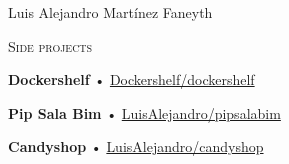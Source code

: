 \documentclass[12pt]{article}
\begin{document}
\begin{cv}{Luis Alejandro Mart\'inez Faneyth}
\begin{minipage}[t]{0.35\textwidth}
    \vspace{0.25em}
    \begin{minipage}{\linewidth}
      \textrm{\textsc{\Large{Side projects}}}
      \newline
      \parbox[t]{\linewidth}{
        \textbf{Dockershelf} • \href{https://github.com/Dockershelf/dockershelf}{Dockershelf/dockershelf}\\
      }
      \parbox[t]{\linewidth}{
        \textbf{Pip Sala Bim} • \href{https://github.com/LuisAlejandro/pipsalabim}{LuisAlejandro/pipsalabim}\\
      }
      \parbox[t]{\linewidth}{
        \textbf{Candyshop} • \href{https://github.com/LuisAlejandro/candyshop}{LuisAlejandro/candyshop}\\
      }
    \end{minipage}
  
  \end{minipage}\hspace{0.5cm}
  \begin{minipage}[t]{0.55\textwidth}
    \vspace{0.125em}


\end{minipage}
\end{cv}
\end{document}
